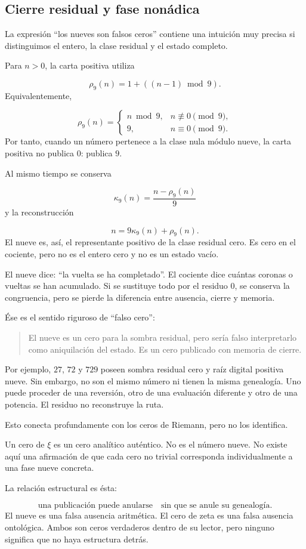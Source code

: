 \subsection{Cierre residual y fase nonádica}
La expresión “los nueves son falsos ceros” contiene una intuición muy precisa si distinguimos el entero, la clase residual y el estado completo.\par
Para \(n>0\), la carta positiva utiliza\par
\[
\rho_9(n)
=
1+((n-1)\bmod9).
\]
Equivalentemente,\par
\[
\rho_9(n)
=
\begin{cases}
n\bmod9,
&
n\not\equiv0\pmod9,\\[1mm]
9,
&
n\equiv0\pmod9.
\end{cases}
\]
Por tanto, cuando un número pertenece a la clase nula módulo nueve, la carta positiva no publica \(0\): publica \(9\).\par
Al mismo tiempo se conserva\par
\[
\kappa_9(n)
=
\frac{n-\rho_9(n)}9
\]
y la reconstrucción\par
\[
n
=
9\kappa_9(n)
+
\rho_9(n).
\]
El nueve es, así, el representante positivo de la clase residual cero. Es cero en el cociente, pero no es el entero cero y no es un estado vacío.\par
El nueve dice: “la vuelta se ha completado”. El cociente dice cuántas coronas o vueltas se han acumulado. Si se sustituye todo por el residuo \(0\), se conserva la congruencia, pero se pierde la diferencia entre ausencia, cierre y memoria.\par
Ése es el sentido riguroso de “falso cero”:\par
\begin{quote}
El nueve es un cero para la sombra residual, pero sería falso interpretarlo como aniquilación del estado. Es un cero publicado con memoria de cierre.\par
\end{quote}
Por ejemplo, \(27\), \(72\) y \(729\) poseen sombra residual cero y raíz digital positiva nueve. Sin embargo, no son el mismo número ni tienen la misma genealogía. Uno puede proceder de una reversión, otro de una evaluación diferente y otro de una potencia. El residuo no reconstruye la ruta.\par
Esto conecta profundamente con los ceros de Riemann, pero no los identifica.\par
Un cero de \(\xi\) es un cero analítico auténtico. No es el número nueve. No existe aquí una afirmación de que cada cero no trivial corresponda individualmente a una fase nueve concreta.\par
La relación estructural es ésta:\par
\[
\text{una publicación puede anularse}
\quad\text{sin que se anule su genealogía}.
\]
El nueve es una falsa ausencia aritmética. El cero de zeta es una falsa ausencia ontológica. Ambos son ceros verdaderos dentro de su lector, pero ninguno significa que no haya estructura detrás.\par
{}
